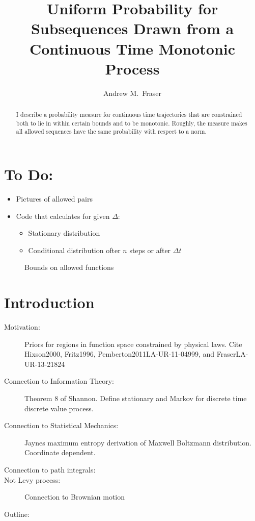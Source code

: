 \documentclass[12pt]{article} \usepackage{amsmath,amsfonts}
\title{Uniform Probability for Subsequences Drawn from a Continuous
  Time Monotonic Process }
\author{Andrew M.\ Fraser}
\begin{document}
\maketitle
\begin{abstract}
  I describe a probability measure for continuous time trajectories that
  are constrained both to lie in within certain bounds and to be
  monotonic.  Roughly, the measure makes all allowed sequences have
  the same probability with respect to a norm.
\end{abstract}

\section*{To Do:}
\label{sec:do}

\begin{itemize}
\item Pictures of allowed pairs
\item Code that calculates for given $\Delta$:
  \begin{itemize}
  \item Stationary distribution
  \item Conditional distribution ofter $n$ steps or after $\Delta t$
  \end{itemize}

\end{itemize}
\begin{figure*}
  \centering
  \caption{Bounds on allowed functions}
  \label{fig:mt2}
\end{figure*}

\section{Introduction}
\label{sec:introduction}
\begin{description}
\item[Motivation:] Priors for regions in function space constrained by
  physical laws.  Cite Hixson2000, Fritz1996,
  Pemberton2011LA-UR-11-04999, and FraserLA-UR-13-21824
\item[Connection to Information Theory:] Theorem 8 of Shannon.  Define
  stationary and Markov for discrete time discrete value process.
\item[Connection to Statistical Mechanics:] Jaynes maximum entropy
  derivation of Maxwell Boltzmann distribution.  Coordinate dependent.
\item[Connection to path integrals:]
\item[Not Levy process:] Connection to Brownian motion
\item[Outline:]
\end{description}
\end{document}
